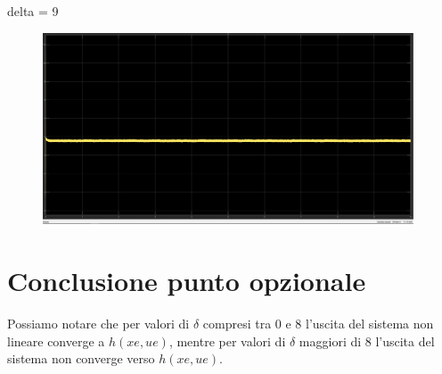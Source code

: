 \documentclass[a4paper, 11pt]{article}
\begin{document}
\newpage
delta = 9\\
\begin{figure}[H]
    \centering
\includegraphics[width=110mm]{figs/delta9.PNG}
    \caption{}
    \label{Figura13}
\end{figure}

\section{Conclusione punto opzionale}

Possiamo notare che per valori di $\delta$ compresi tra 0 e 8 l'uscita del sistema non lineare converge a $h(xe,ue)$, mentre per valori di $\delta$ maggiori di 8 l'uscita del sistema non converge verso $h(xe,ue)$.
\end{document}

